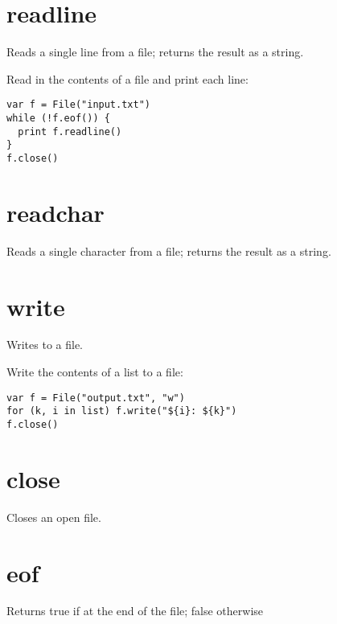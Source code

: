 \hypertarget{readline}{%
\section{readline}\label{readline}}

Reads a single line from a file; returns the result as a string.

Read in the contents of a file and print each line:

\begin{lstlisting}
var f = File("input.txt")
while (!f.eof()) {
  print f.readline()
}
f.close()
\end{lstlisting}

\hypertarget{readchar}{%
\section{readchar}\label{readchar}}

Reads a single character from a file; returns the result as a string.

\hypertarget{write}{%
\section{write}\label{write}}

Writes to a file.

Write the contents of a list to a file:

\begin{lstlisting}
var f = File("output.txt", "w")
for (k, i in list) f.write("${i}: ${k}")
f.close()
\end{lstlisting}

\hypertarget{close}{%
\section{close}\label{close}}

Closes an open file.

\hypertarget{eof}{%
\section{eof}\label{eof}}

Returns true if at the end of the file; false otherwise
